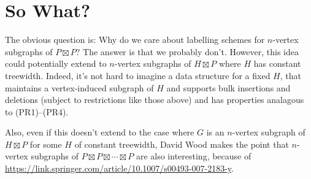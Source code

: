 \documentclass[kpfonts]{patmorin}
\begin{document}

\section{So What?}

The obvious question is: Why do we care about labelling schemes for $n$-vertex subgraphs of $P\boxtimes P$? The answer is that we probably don't.  However, this idea could potentially extend to $n$-vertex subgraphs of $H\boxtimes P$ where $H$ has constant treewidth.  Indeed, it's not hard to imagine a data structure for a fixed $H$, that maintains a vertex-induced subgraph of $H$ and supports bulk insertions and deletions (subject to restrictions like those above) and has properties analagous to (PR1)--(PR4).

Also, even if this doesn't extend to the case where $G$ is an $n$-vertex subgraph of $H\boxtimes P$ for some $H$ of constant treewidth, David Wood makes the point that $n$-vertex subgraphs of $P\boxtimes P\boxtimes\cdots\boxtimes P$ are also interesting, because of \url{https://link.springer.com/article/10.1007/s00493-007-2183-y}.









% 
% 
% 
% 
% 
\end{document}
